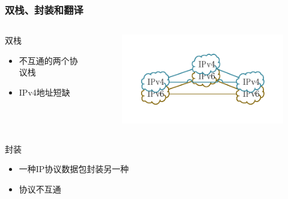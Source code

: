 \documentclass{beamer}
\begin{document}
\begin{frame}
  \frametitle{双栈、封装和翻译}

  \vspace{-1em}
  \begin{columns}[T] %
    \begin{column}{.4\textwidth}
      \begin{block}{双栈}
        \begin{itemize}
        \item 不互通的两个协议栈
        \item IPv4地址短缺
        \end{itemize}
      \end{block}
    \end{column}
    \hfill
    \begin{column}{.49\textwidth}
      \vspace{-2em}
      \begin{figure}
        \includegraphics[width=\textwidth]{figs/16-dual-stack.pdf}
      \end{figure}
      \vspace{-2em}
    \end{column}
  \end{columns}
  \begin{columns}[T]
    \begin{column}{.4\textwidth}
      \begin{block}{封装}
        \begin{itemize}
        \item 一种IP协议数据包封装另一种
        \item 协议不互通
        \end{itemize}
      \end{block}
    \end{column}
    \hfill
    \begin{column}{.49\textwidth}

\end{column}
\end{columns}
\end{frame}
\end{document}
